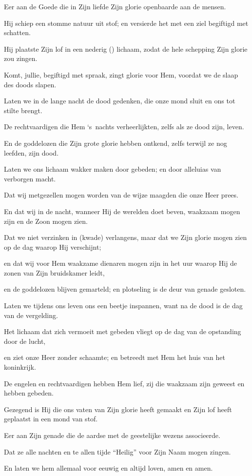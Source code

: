\documentclass[12pt,twoside,a5paper]{article}
\begin{document}
\begin{halfparskip}

  Eer aan de Goede die in Zijn liefde Zijn glorie openbaarde aan de mensen.

  Hij schiep een stomme natuur uit stof; en versierde het met een ziel begiftigd met schatten.

  Hij plaatste Zijn lof in een nederig () lichaam, zodat de hele schepping Zijn glorie zou zingen.

  Komt, jullie, begiftigd met spraak, zingt glorie voor Hem, voordat we de slaap des doods slapen.

  Laten we in de lange nacht de dood gedenken, die onze mond sluit en ons tot stilte brengt.

  De rechtvaardigen die Hem `s~nachts verheerlijkten, zelfs als ze dood zijn, leven.

  En de goddelozen die Zijn grote glorie hebben ontkend, zelfs terwijl ze nog leefden, zijn dood.

  Laten we ons lichaam wakker maken door gebeden; en door alleluias van verborgen macht.

  Dat wij metgezellen mogen worden van de wijze maagden die onze Heer prees.

  En dat wij in de nacht, wanneer Hij de werelden doet beven, waakzaam mogen zijn en de Zoon mogen zien.

  Dat we niet verzinken in (kwade) verlangens, maar dat we Zijn glorie mogen zien op de dag waarop Hij verschijnt;

  en dat wij voor Hem waakzame dienaren mogen zijn in het uur waarop Hij de zonen van Zijn bruidskamer leidt,

  en de goddelozen blijven gemarteld; en plotseling is de deur van genade gesloten.

  Laten we tijdens ons leven ons een beetje inspannen, want na de dood is de dag van de vergelding.

  Het lichaam dat zich vermoeit met gebeden vliegt op de dag van de opstanding door de lucht,

  en ziet onze Heer zonder schaamte; en betreedt met Hem het huis van het koninkrijk.

  De engelen en rechtvaardigen hebben Hem lief, zij die waakzaam zijn geweest en hebben gebeden.

  Gezegend is Hij die ons vaten van Zijn glorie heeft gemaakt en Zijn lof heeft geplaatst in een mond van stof.

  Eer aan Zijn genade die de aardse met de geestelijke wezens associeerde.

  Dat ze alle nachten en te allen tijde ``Heilig'' voor Zijn Naam mogen zingen.

  En laten we hem allemaal voor eeuwig en altijd loven, amen en amen.
\end{halfparskip}
\end{document}
